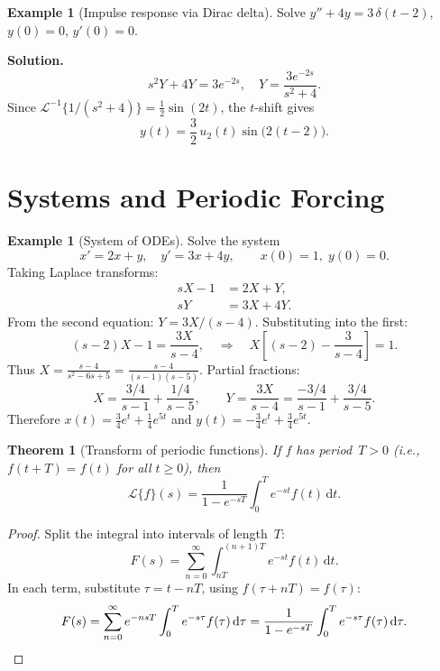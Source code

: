 \documentclass[12pt,a4paper,openany]{book}
\theoremstyle{definition}
\newtheorem{example}[definition]{Example}
\theoremstyle{plain}
\newtheorem{theorem}[definition]{Theorem}
\theoremstyle{remark}
\newcommand{\dd}{\mathrm{d}}
\begin{document}
\begin{example}[Impulse response via Dirac delta]
\label{ex:laplace-impulse}
Solve \(y''+4y=3\,\delta(t-2)\), \(y(0)=0\), \(y'(0)=0\).

\medskip\noindent\textbf{Solution.}
\[
  s^2Y+4Y=3e^{-2s}, \quad Y=\frac{3e^{-2s}}{s^2+4}.
\]
Since \(\mathcal{L}^{-1}\{1/(s^2+4)\}=\frac{1}{2}\sin(2t)\), the
\(t\)-shift gives
\[
  y(t) = \frac{3}{2}\,u_2(t)\sin\bigl(2(t-2)\bigr).
\]
\end{example}

\section{Systems and Periodic Forcing}
\label{sec:laplace-systems}

\begin{example}[System of ODEs]
\label{ex:laplace-system}
Solve the system
\[
  x' = 2x + y, \quad y' = 3x + 4y, \qquad x(0)=1,\; y(0)=0.
\]
Taking Laplace transforms:
\begin{align*}
  sX - 1 &= 2X + Y, \\
  sY &= 3X + 4Y.
\end{align*}
From the second equation: \(Y=3X/(s-4)\). Substituting into the first:
\[
  (s-2)X - 1 = \frac{3X}{s-4},
  \quad\Longrightarrow\quad
  X\left[(s-2)-\frac{3}{s-4}\right]=1.
\]
Thus \(X=\frac{s-4}{s^2-6s+5}=\frac{s-4}{(s-1)(s-5)}\). Partial fractions:
\[
  X = \frac{3/4}{s-1}+\frac{1/4}{s-5},
  \qquad
  Y = \frac{3X}{s-4} = \frac{-3/4}{s-1}+\frac{3/4}{s-5}.
\]
Therefore \(x(t)=\frac{3}{4}e^t+\frac{1}{4}e^{5t}\) and
\(y(t)=-\frac{3}{4}e^t+\frac{3}{4}e^{5t}\).
\end{example}

\begin{theorem}[Transform of periodic functions]
\label{thm:laplace-periodic}
If \(f\) has period~\(T>0\) (i.e., \(f(t+T)=f(t)\) for all \(t\ge 0\)), then
\begin{equation}\label{eq:laplace-periodic}
  \mathcal{L}\{f\}(s) = \frac{1}{1-e^{-sT}}\int_0^T e^{-st}f(t)\,\dd t.
\end{equation}
\end{theorem}

\begin{proof}
Split the integral into intervals of length~\(T\):
\[
  F(s)=\sum_{n=0}^\infty \int_{nT}^{(n+1)T} e^{-st}f(t)\,\dd t.
\]
In each term, substitute \(\tau=t-nT\), using \(f(\tau+nT)=f(\tau)\):
\[
  F(s)=\sum_{n=0}^\infty e^{-nsT}\int_0^T e^{-s\tau}f(\tau)\,\dd\tau
  = \frac{1}{1-e^{-sT}}\int_0^T e^{-s\tau}f(\tau)\,\dd\tau. \qedhere
\]
\end{proof}
\end{document}
